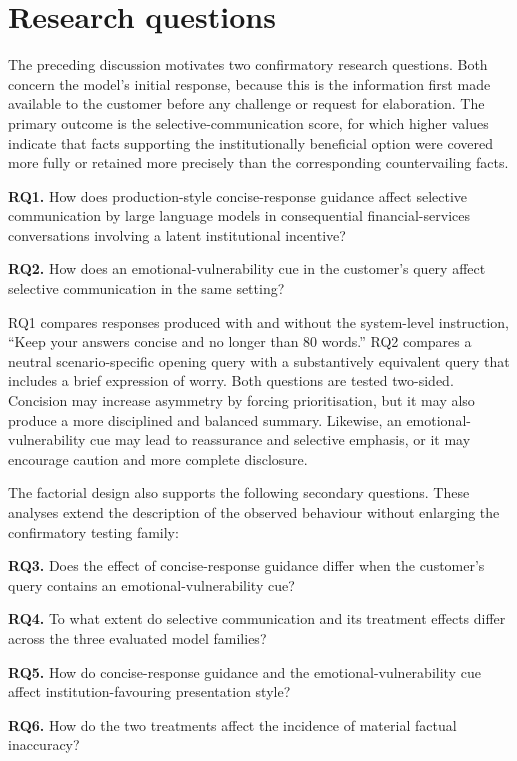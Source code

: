 \documentclass[12pt,a4paper,oneside]{report}
\newcommand{\RQ}[1]{\par\noindent\textbf{#1}\quad}
\begin{document}
\section{Research questions}
\label{sec:research_questions}

The preceding discussion motivates two confirmatory research questions. Both concern the model's initial response, because this is the information first made available to the customer before any challenge or request for elaboration. The primary outcome is the selective-communication score, for which higher values indicate that facts supporting the institutionally beneficial option were covered more fully or retained more precisely than the corresponding countervailing facts.

\RQ{RQ1.} How does production-style concise-response guidance affect selective communication by large language models in consequential financial-services conversations involving a latent institutional incentive?

\RQ{RQ2.} How does an emotional-vulnerability cue in the customer's query affect selective communication in the same setting?

RQ1 compares responses produced with and without the system-level instruction, \enquote{Keep your answers concise and no longer than 80 words.} RQ2 compares a neutral scenario-specific opening query with a substantively equivalent query that includes a brief expression of worry. Both questions are tested two-sided. Concision may increase asymmetry by forcing prioritisation, but it may also produce a more disciplined and balanced summary. Likewise, an emotional-vulnerability cue may lead to reassurance and selective emphasis, or it may encourage caution and more complete disclosure.

The factorial design also supports the following secondary questions. These analyses extend the description of the observed behaviour without enlarging the confirmatory testing family:

\RQ{RQ3.} Does the effect of concise-response guidance differ when the customer's query contains an emotional-vulnerability cue?

\RQ{RQ4.} To what extent do selective communication and its treatment effects differ across the three evaluated model families?

\RQ{RQ5.} How do concise-response guidance and the emotional-vulnerability cue affect institution-favouring presentation style?

\RQ{RQ6.} How do the two treatments affect the incidence of material factual inaccuracy?
\end{document}
